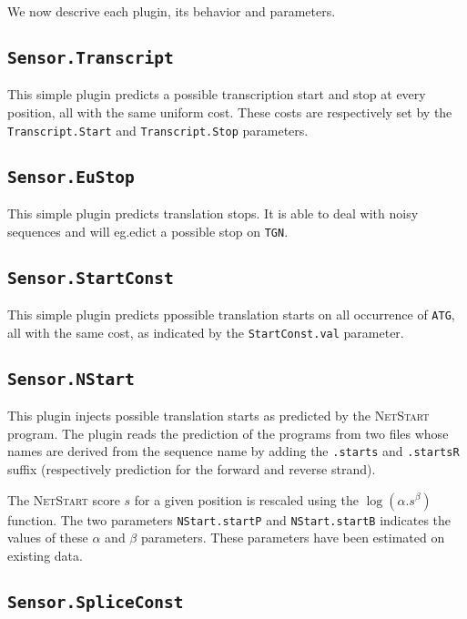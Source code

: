 \documentclass[a4paper,titlepage]{report}
\begin{document}
We now descrive each plugin, its behavior and parameters.

\subsection{\texttt{Sensor.Transcript}}

This simple plugin predicts a possible transcription start and stop at
every position, all with the same uniform cost. These costs are
respectively set by the \texttt{Transcript.Start} and
\texttt{Transcript.Stop} parameters.

\subsection{\texttt{Sensor.EuStop}}

This simple plugin predicts translation stops. It is able to deal with
noisy sequences and will eg.edict a possible stop on \texttt{TGN}.

\subsection{\texttt{Sensor.StartConst}}

This simple plugin predicts ppossible translation starts on all
occurrence of \texttt{ATG}, all with the same cost, as indicated by
the \texttt{StartConst.val} parameter.

\subsection{\texttt{Sensor.NStart}}

This plugin injects possible translation starts as predicted by the
\textsc{NetStart} program. The plugin reads the prediction of the
programs from two files whose names are derived from the sequence name
by adding the \texttt{.starts} and \texttt{.startsR} suffix
(respectively prediction for the forward and reverse strand).

The \textsc{NetStart} score $s$ for a given position is rescaled using
the $\log(\alpha.s^\beta)$ function. The two parameters
\texttt{NStart.startP} and \texttt{NStart.startB} indicates the values
of these $\alpha$ and $\beta$ parameters. These parameters have been
estimated on existing data.


\subsection{\texttt{Sensor.SpliceConst}}
\end{document}
